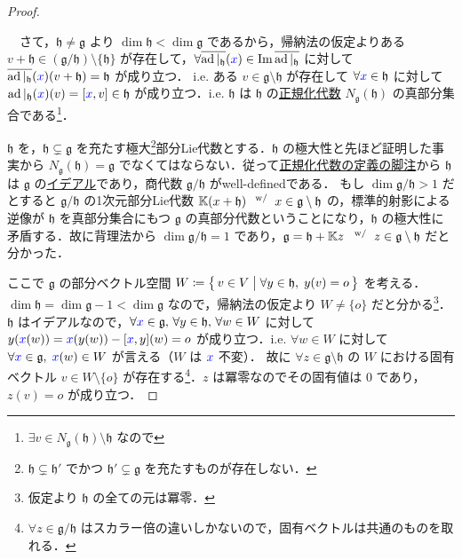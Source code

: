 \documentclass[rep_main]{subfiles}
\begin{document}
\begin{proof}
\begin{description}
            　さて，$\mathfrak{h} \neq \mathfrak{g}$ より $\dim \mathfrak{h} < \dim \mathfrak{g}$ であるから，帰納法の仮定よりある $v + \mathfrak{h} \in (\mathfrak{g} / \mathfrak{h}) \setminus \{\mathfrak{h}\}$ が存在して，$\forall \overline{\operatorname{ad}|_{\mathfrak{h}}} (\textcolor{blue}{x}) \in \Im \overline{\operatorname{ad}|_{\mathfrak{h}}}$ に対して $\overline{\operatorname{ad}|_{\mathfrak{h}}} (\textcolor{blue}{x}) (v + \mathfrak{h}) = \mathfrak{h}$ が成り立つ．
            i.e. ある $v \in \mathfrak{g} \setminus \mathfrak{h}$ が存在して $\forall \textcolor{blue}{x} \in \mathfrak{h}$ に対して $\ad|_{\mathfrak{h}} (\textcolor{blue}{x}) (v) = \comm{\textcolor{blue}{x}}{v} \in \mathfrak{h}$ が成り立つ．i.e. $\mathfrak{h}$ は $\mathfrak{h}$ の\hyperref[def:normalizer-LieAlg]{正規化代数} $N_{\mathfrak{g}} (\mathfrak{h})$ の真部分集合である\footnote{$\exists v \in N_{\mathfrak{g}}(\mathfrak{h}) \setminus \mathfrak{h}$ なので}．
    \end{description}

    $\mathfrak{h}$ を，$\mathfrak{h} \subsetneq \mathfrak{g}$ を充たす極大\footnote{$\mathfrak{h} \subsetneq \mathfrak{h}'$ でかつ $\mathfrak{h}' \subsetneq \mathfrak{g}$ を充たすものが存在しない．}部分Lie代数とする．$\mathfrak{h}$ の極大性と先ほど証明した事実から $N_{\mathfrak{g}} (\mathfrak{h}) = \mathfrak{g}$ でなくてはならない．従って\hyperref[def:normalizer-LieAlg]{正規化代数の定義の脚注}から $\mathfrak{h}$ は $\mathfrak{g}$ の\hyperref[def:ideal-LieAlg]{イデアル}であり，商代数 $\mathfrak{g} / \mathfrak{h}$ がwell-definedである．
    もし $\dim \mathfrak{g} / \mathfrak{h} > 1$ だとすると $\mathfrak{g} / \mathfrak{h}$ の1次元部分Lie代数 $\mathbb{K} (x + \mathfrak{h})\, \mathrel{} {}^{\mathrm{w}/} \mathrel{} x \in \mathfrak{g} \setminus \mathfrak{h}$ の，標準的射影による逆像が $\mathfrak{h}$ を真部分集合にもつ $\mathfrak{g}$ の真部分代数ということになり，$\mathfrak{h}$ の極大性に矛盾する．故に背理法から $\dim \mathfrak{g} / \mathfrak{h} = 1$ であり，$\mathfrak{g} = \mathfrak{h} + \mathbb{K} z\; \mathrel{} {}^{\mathrm{w}/} \mathrel{} z \in \mathfrak{g} \setminus \mathfrak{h}$ だと分かった．

    ここで $\mathfrak{g}$ の部分ベクトル空間 $W \coloneqq \bigl\{\, v \in V \bigm| \forall y \in \mathfrak{h},\; y(v) = o \,\bigr\}$ を考える．$\dim \mathfrak{h} = \dim \mathfrak{g} - 1 < \dim \mathfrak{g}$ なので，帰納法の仮定より $W \neq \{o\}$ だと分かる\footnote{仮定より $\mathfrak{h}$ の全ての元は冪零．}．
    $\mathfrak{h}$ はイデアルなので，$\forall \textcolor{blue}{x} \in \mathfrak{g},\, \forall y \in \mathfrak{h},\, \forall w \in W$ に対して $y (\textcolor{blue}{x}(w)) = \textcolor{blue}{x} (y(w)) - \comm{\textcolor{blue}{x}}{y}(w) = o$ が成り立つ．i.e. $\forall w \in W$ に対して $\forall \textcolor{blue}{x} \in \mathfrak{g},\; \textcolor{blue}{x} (w) \in W$ が言える（$W$ は $\textcolor{blue}{x}$ 不変）．
    故に $\forall z \in \mathfrak{g} \setminus \mathfrak{h}$ の $W$ における固有ベクトル $v \in W \setminus \{o\}$ が存在する\footnote{$\forall z \in \mathfrak{g}/\mathfrak{h}$ はスカラー倍の違いしかないので，固有ベクトルは共通のものを取れる．}．$z$ は冪零なのでその固有値は $0$ であり，$z (v) = o$ が成り立つ．



\end{proof}
\end{document}
